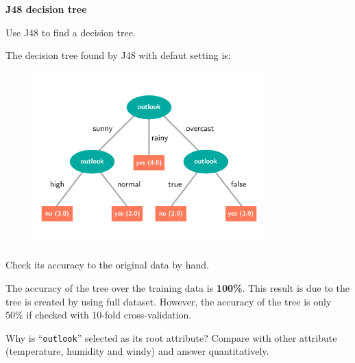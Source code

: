 \documentclass[12pt,twoside]{article}
\begin{document}
\begin{exercises}
\problem \textbf{J48 decision tree}

\begin{exerciseparts}

\exercisepart 
Use J48 to find a decision tree.

\ifsolution \solution{}
The decision tree found by J48 with defaut setting is:
\begin{figure}[h]
  \includegraphics[width=0.8\textwidth]{j48tree.pdf}
  \centering
\end{figure}
\fi

\exercisepart
Check its accuracy to the original data by hand.

\ifsolution \solution{}
The accuracy of the tree over the training data is \textbf{100\%}.
This result is due to the tree is created by using full
dataset. However, the accuracy of the tree is only 50\% if
checked with 10-fold cross-validation.
\fi

\exercisepart
Why is ``\texttt{outlook}'' selected as its root attribute? 
Compare with other attribute (temperature, humidity and windy)
and answer quantitatively.


\end{exerciseparts}
\end{exercises}
\end{document}
